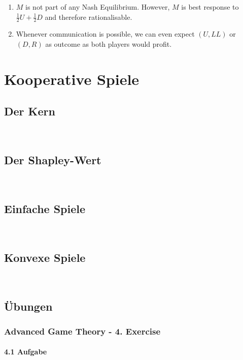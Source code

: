 \documentclass[12pt]{extreport} %
\theoremstyle{named}
\theoremstyle{itshape}
\theoremstyle{normal}
\begin{document}
\begin{enumerate}
\begin{proof}[Proof (Using the Proposition after the Definition of Mixed Strategy NE)]
\begin{itemize}
					\item For the remaining cases four cases the proof follows analogously; we find the necessary probability and show that deviation is enlarging the utility.
				\end{itemize}
			\end{proof}
	\item $M$ is not part of any Nash Equilibrium. However, $M$ is best response to $\frac{1}{2} U + \frac{1}{2}D$ and therefore rationalisable.
	\item Whenever communication is possible, we can even expect $(U, LL)$ or $(D, R)$ as outcome as both players would profit.
\end{enumerate}

\chapter{Kooperative Spiele}

\section{Der Kern}

~\newpage

\section{Der Shapley-Wert}

~\newpage

\section{Einfache Spiele}

~\newpage

\section{Konvexe Spiele}

~\newpage

\section{Übungen}

\subsection*{Advanced Game Theory - 4. Exercise}

\subsubsection*{4.1 Aufgabe}
\end{document}
